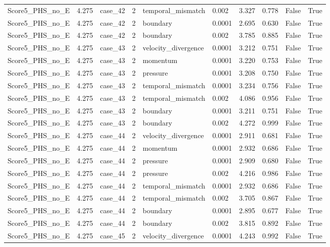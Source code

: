 \begin{longtable}{llllllllll}
Score5\_PHS\_no\_E & 4.275 & case\_42 & 2 & temporal\_mismatch & 0.002 & 3.327 & 0.778 & False & True \\
Score5\_PHS\_no\_E & 4.275 & case\_42 & 2 & boundary & 0.0001 & 2.695 & 0.630 & False & True \\
Score5\_PHS\_no\_E & 4.275 & case\_42 & 2 & boundary & 0.002 & 3.785 & 0.885 & False & True \\
Score5\_PHS\_no\_E & 4.275 & case\_43 & 2 & velocity\_divergence & 0.0001 & 3.212 & 0.751 & False & True \\
Score5\_PHS\_no\_E & 4.275 & case\_43 & 2 & momentum & 0.0001 & 3.220 & 0.753 & False & True \\
Score5\_PHS\_no\_E & 4.275 & case\_43 & 2 & pressure & 0.0001 & 3.208 & 0.750 & False & True \\
Score5\_PHS\_no\_E & 4.275 & case\_43 & 2 & temporal\_mismatch & 0.0001 & 3.234 & 0.756 & False & True \\
Score5\_PHS\_no\_E & 4.275 & case\_43 & 2 & temporal\_mismatch & 0.002 & 4.086 & 0.956 & False & True \\
Score5\_PHS\_no\_E & 4.275 & case\_43 & 2 & boundary & 0.0001 & 3.211 & 0.751 & False & True \\
Score5\_PHS\_no\_E & 4.275 & case\_43 & 2 & boundary & 0.002 & 4.272 & 0.999 & False & True \\
Score5\_PHS\_no\_E & 4.275 & case\_44 & 2 & velocity\_divergence & 0.0001 & 2.911 & 0.681 & False & True \\
Score5\_PHS\_no\_E & 4.275 & case\_44 & 2 & momentum & 0.0001 & 2.932 & 0.686 & False & True \\
Score5\_PHS\_no\_E & 4.275 & case\_44 & 2 & pressure & 0.0001 & 2.909 & 0.680 & False & True \\
Score5\_PHS\_no\_E & 4.275 & case\_44 & 2 & pressure & 0.002 & 4.216 & 0.986 & False & True \\
Score5\_PHS\_no\_E & 4.275 & case\_44 & 2 & temporal\_mismatch & 0.0001 & 2.932 & 0.686 & False & True \\
Score5\_PHS\_no\_E & 4.275 & case\_44 & 2 & temporal\_mismatch & 0.002 & 3.705 & 0.867 & False & True \\
Score5\_PHS\_no\_E & 4.275 & case\_44 & 2 & boundary & 0.0001 & 2.895 & 0.677 & False & True \\
Score5\_PHS\_no\_E & 4.275 & case\_44 & 2 & boundary & 0.002 & 3.815 & 0.892 & False & True \\
Score5\_PHS\_no\_E & 4.275 & case\_45 & 2 & velocity\_divergence & 0.0001 & 4.243 & 0.992 & False & True \\

\end{longtable}
